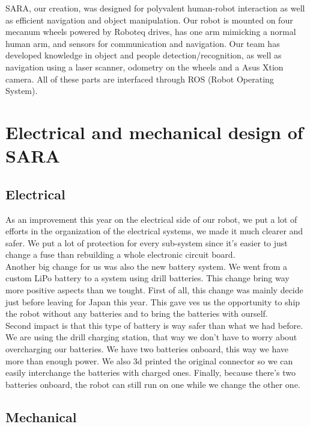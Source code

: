 \documentclass[runningheads,a4paper]{llncs}
\begin{document}
SARA, our creation, was designed for polyvalent human-robot interaction as well as efficient navigation and object manipulation. Our robot is mounted on four mecanum wheels powered by Roboteq drives, has one arm mimicking a normal human arm, and sensors for communication and navigation. Our team has developed knowledge in object and people detection/recognition, as well as navigation using a laser scanner, odometry on the wheels and a Asus Xtion camera. All of these parts are interfaced through ROS (Robot Operating System). \\

\section{Electrical and mechanical design of SARA}
\subsection{Electrical}

\tab As an improvement this year on the electrical side of our robot, we put a lot of efforts in the organization of the electrical systems, we made it much clearer and safer. We put a lot of protection for every sub-system since it’s easier to just change a fuse than rebuilding a whole electronic circuit board.\\

Another big change for us was also the new battery system. We went from a custom LiPo battery to a system using drill batteries. This change bring way more positive aspects than we tought. First of all, this change was mainly decide just before leaving for Japan this year. This gave ves us the opportunity to ship the robot without any batteries and to bring the batteries with ourself. \\

Second impact is that this type of battery is way safer than what we had before. We are using the drill charging station, that way we don’t have to worry about overcharging our batteries. We have two batteries onboard, this way we have more than enough power. We also 3d printed the original connector so we can easily interchange the batteries with charged ones. Finally, because there’s two batteries onboard, the robot can still run on one while we change the other one.\\


\subsection{Mechanical}
\end{document}
